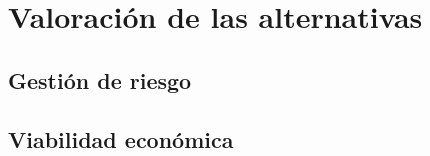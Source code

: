 \documentclass[10pt,a4paper,oldfontcommands]{dpds}
\begin{document}
\pagecolor{fondo}
\color{principal}

















\section{Valoración de las alternativas}
\subsection{Gestión de riesgo}
\subsection{Viabilidad económica}


\end{document}
